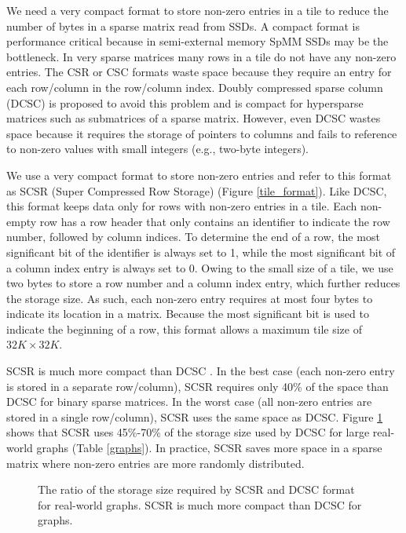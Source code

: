 We need a very compact format to store non-zero entries in a tile to reduce
the number of bytes in a sparse matrix read from SSDs. A compact format is
performance critical because in semi-external memory SpMM SSDs
may be the bottleneck. In very sparse matrices many rows in a tile
do not have any non-zero entries. The CSR or CSC formats waste space because
they require an entry for each row/column in the row/column index. Doubly
compressed sparse column (DCSC) \cite{Buluc08} is proposed to avoid this problem
and is compact for hypersparse matrices such as submatrices of a sparse matrix.
However, even DCSC wastes space because it requires the storage of
pointers to columns and fails to reference to non-zero values with small
integers (e.g., two-byte integers).

We use a very compact format to store non-zero entries and refer to this
format as SCSR (Super Compressed Row Storage) (Figure \ref{tile_format}).
Like DCSC, this format keeps data only for rows with non-zero entries in a tile.
Each non-empty row has a row header that only contains an identifier
to indicate the row number, followed by column indices. To determine the end
of a row, the most significant bit of the identifier is always set to 1, while
the most significant bit of a column index entry is always set to 0.
Owing to the small size of a tile, we use two bytes to store a row
number and a column index entry, which further reduces the storage size. As such,
each non-zero entry requires at most four bytes to indicate its location in
a matrix. Because the most significant bit is used to indicate the beginning
of a row, this format allows a maximum tile size of $32K \times 32K$.

SCSR is
much more compact than DCSC \cite{Buluc08}. In the best case (each non-zero
entry is stored in a separate row/column), SCSR requires only 40\% of the space
than DCSC for binary sparse matrices. In the worst case (all non-zero entries
are stored in a single row/column), SCSR uses the same space as DCSC. Figure
\ref{fig:storage} shows that SCSR uses 45\%-70\% of the storage size used by
DCSC for large real-world graphs (Table \ref{graphs}). In practice, SCSR saves
more space
in a sparse matrix where non-zero entries are more randomly distributed.

\begin{figure}
	\begin{center}
		\footnotesize
		
		\caption{The ratio of the storage size required by SCSR and DCSC
			\cite{Buluc08} format for real-world graphs. SCSR is much more
		compact than DCSC for graphs.}
		\label{fig:storage}
	\end{center}
\end{figure}

